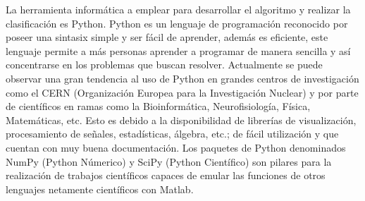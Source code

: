 La herramienta informática a emplear para desarrollar el algoritmo y realizar la clasificación es Python. Python es un lenguaje de programación reconocido por poseer una sintasix simple y ser fácil de aprender, además es eficiente, este lenguaje permite a más personas aprender a programar de manera sencilla y así concentrarse en los problemas que buscan resolver. Actualmente se puede observar una gran tendencia al uso de Python en grandes centros de investigación como el CERN (Organización Europea para la Investigación Nuclear) y por parte de científicos en ramas como la Bioinformática, Neurofisiología, Física, Matemáticas, etc. Esto es debido a la disponibilidad de librerías de visualización, procesamiento de señales, estadísticas, álgebra, etc.; de fácil utilización y que cuentan con muy buena documentación. Los paquetes de Python denominados NumPy (Python Númerico) y SciPy (Python Científico) son pilares para la realización de trabajos científicos capaces de emular las funciones de otros lenguajes netamente científicos con Matlab.\\






